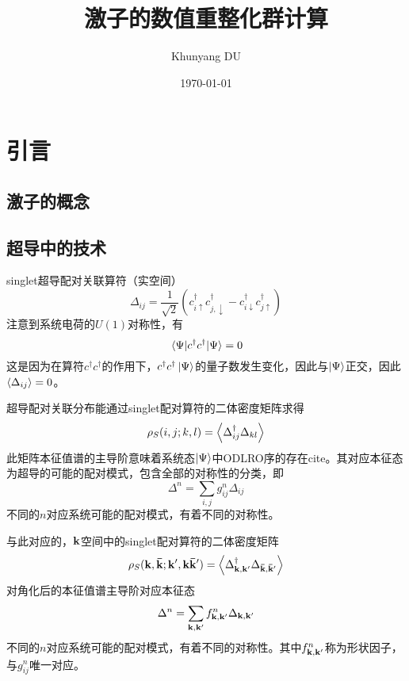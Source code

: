 \documentclass{article}
\title{激子的数值重整化群计算}
\author{Khunyang DU}
\date{\today}
\begin{document}
	\maketitle
	\tableofcontents
	\section{引言}
	\subsection{激子的概念}
	\subsection{超导中的技术}
	singlet超导配对关联算符（实空间）
	\begin{equation}
		\Delta_{ij}=\frac{1}{\sqrt{2}}\left(c^\dagger_{i\uparrow}c^\dagger_{j,\downarrow}-c^\dagger_{i\downarrow}c^\dagger_{j\uparrow}\right)
	\end{equation}
	注意到系统电荷的$U(1)$对称性，有
	\begin{equation}
		\expval{c^\dagger c^\dagger}{\Psi}=0
	\end{equation}
	这是因为在算符$c^\dagger c^\dagger$的作用下，$c^\dagger c^\dagger\ket{\Psi} $的量子数发生变化，因此与$\ket{\Psi}$正交，因此$\expval{\Delta_{ij}}=0$。
	
	超导配对关联分布能通过singlet配对算符的二体密度矩阵求得\cite{PhysRevLett.129.177001}
	\begin{equation}
		\rho_S(i,j;k,l) = \expval{\Delta_{ij}^\dagger\Delta_{kl}}
	\end{equation}
	此矩阵本征值谱的主导阶意味着系统态$\ket{\Psi}$中ODLRO序的存在cite。其对应本征态为超导的可能的配对模式，包含全部的对称性的分类，即
	\begin{equation}
		\Delta^n = \sum_{i,j}g^n_{ij}\Delta_{ij}
	\end{equation}
	不同的$n$对应系统可能的配对模式，有着不同的对称性。
	
	与此对应的，$\vb{k}$空间中的singlet配对算符的二体密度矩阵
	\begin{equation}
		\rho_S(\vb{k,\bar{k};k',k\bar{k}'}) = \expval{\Delta_{\vb{k,k'}}^\dagger\Delta_{\vb{\bar{k},\bar{k}'}}}
	\end{equation}
	对角化后的本征值谱主导阶对应本征态
	\begin{equation}
		\Delta^n = \sum_{\vb{k,k'}}f^n_{\vb{k,k'}}\Delta_{\vb{k,k'}}
	\end{equation}
	不同的$n$对应系统可能的配对模式，有着不同的对称性。其中$f^n_{\vb{k,k'}}$称为形状因子，与$g^n_{ij}$唯一对应。
\end{document}

